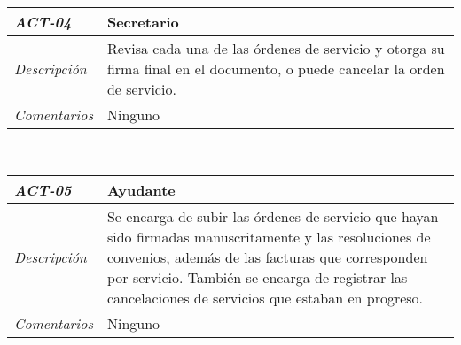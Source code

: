 \begin{center}
\begin{tabular}{ | p{3cm} | p{12.5cm} | }
	\hline
	\rowcolor{lightgray}
	\hfil \textbf{\textit{ACT-04}} &
	\hfil \textbf{Secretario} \\
	\hline
	\raggedleft \textit{Descripci\'on} &
	Revisa cada una de las \'ordenes de servicio
	y otorga su firma final en el documento,
	o puede cancelar la orden de servicio. \\
	\hline
	\raggedleft \textit{Comentarios} & Ninguno \\
	\hline
\end{tabular} \\[1cm]
\begin{tabular}{ | p{3cm} | p{12.5cm} | }
	\hline
	\rowcolor{lightgray}
	\hfil \textbf{\textit{ACT-05}} &
	\hfil \textbf{Ayudante} \\
	\hline
	\raggedleft \textit{Descripci\'on} &
	Se encarga de subir las \'ordenes de servicio
	que hayan sido firmadas manuscritamente y las
	resoluciones de convenios, adem\'as de las
	facturas que corresponden por servicio.
	Tambi\'en se encarga de registrar las
	cancelaciones de servicios que estaban en
	progreso. \\
	\hline
	\raggedleft \textit{Comentarios} & Ninguno \\
	\hline
\end{tabular}
\end{center}
